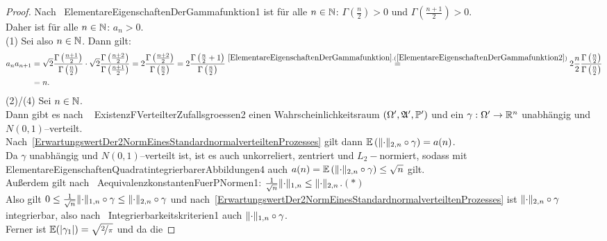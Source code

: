 \begin{proof}
Nach~
{ElementareEigenschaftenDerGammafunktion1} ist für alle $n \in \mathbb{N}$: 
$\Gamma\left(\frac n 2 \right) > 0$ und $\Gamma(\frac{n+1}2)> 0$.\\
Daher ist für alle $n \in \mathbb{N}$: $a_n > 0$.\\
(1) Sei also $n \in \mathbb{N}$. Dann gilt:
\begin{align*}
a_n a_{n+1} &= 
\sqrt 2 \frac{\Gamma\left(\frac{n+1}2 \right)} {\Gamma\left(\frac n 2 \right)}
\cdot
\sqrt 2\frac{\Gamma\left(\frac{n+2}2 \right)}{\Gamma\left(\frac{n+1}2\right)}
= 2 \frac{\Gamma\left(\frac{n+2}2 \right)}{\Gamma\left(\frac n 2 \right)}
= 2 \frac{\Gamma\left(\frac n 2 + 1\right)}{\Gamma\left(\frac n 2 \right)}
\overset{\refclaim{ElementareEigenschaftenDerGammafunktion}
{ElementareEigenschaftenDerGammafunktion2}}= 
2\frac n2 \frac{\Gamma\left(\frac n2\right)}{\Gamma\left(\frac n2\right)}\\
&=n\text.
\end{align*}
(2)/(4) Sei $n \in \mathbb{N}$.\\
Dann gibt es nach ~
{ExistenzFVerteilterZufallsgroessen2}  einen Wahrscheinlichkeitsraum
$(\Omega', \mathfrak{A}', \mathbb{P}')$ und ein
$\gamma: \Omega' \rightarrow \mathbb{R}^n$ unabhängig und $N(0, 1)$--verteilt.\\
Nach~\ref{ErwartungswertDer2NormEinesStandardnormalverteiltenProzesses} gilt
dann $\mathbb{E}\left(\lVert\cdot\rVert_{2, n} \circ \gamma \right) = a(n)$.\\
Da $\gamma$ unabhängig und $N(0,1)$--verteilt ist, ist es auch
unkorreliert, zentriert und $L_2-$normiert, sodass mit
{ElementareEigenschaftenQuadratintegrierbarerAbbildungen4} auch
$a(n) = \mathbb{E}\left(\lVert\cdot\rVert_{2, n} \circ \gamma \right) \le \sqrt n$ gilt.\\
Außerdem gilt nach~
{AequivalenzkonstantenFuerPNormen1}: $\frac 1 {\sqrt n} \lVert\cdot\rVert_{1,n}
\le \lVert\cdot\rVert_{2, n}$.\hfill$(\ast)$\\
Also gilt $0\le\frac 1{\sqrt n}\lVert\cdot\rVert_{1,n}\circ\gamma\le\lVert\cdot\rVert_{2,n}
\circ \gamma$ und nach~\ref{ErwartungswertDer2NormEinesStandardnormalverteiltenProzesses} ist
$\lVert\cdot\rVert_{2, n} \circ \gamma$
integrierbar, also nach~
{Integrierbarkeitskriterien1} auch $\lVert\cdot\rVert_{1,n} \circ \gamma$.\\
Ferner ist $\mathbb{E}(\left|\gamma_1\right|) = \sqrt{\nicefrac 2 \pi}$ und da die

\end{proof}
